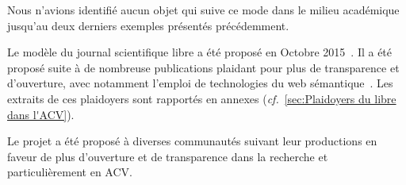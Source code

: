 Nous n'avions identifié aucun objet qui suive ce mode dans le milieu académique jusqu'au deux derniers exemples présentés précédemment.

Le modèle du journal scientifique libre a été proposé en Octobre 2015~\cite{patard_proposal_2015}.
Il a été proposé suite à de nombreuse publications plaidant pour plus de transparence et d'ouverture, avec notamment l'emploi de technologies du web sémantique~\cite{borkum_health_2014,zhang_lca-oriented_2015,davis_making_2012,mutel_ideas_2014,masanet_reflections_2014,lamela_footprinted._2011,sayan_contribution_2011,belleau_bio2rdf:_2008,perez_role_2014,ingwersen_new_2015,weidema_bonsai_2014,ciroth_ict_2007,funtowicz_science_1993,logan_ten_2010,bonanni_open_2010,madlberger_development_2013}.
Les extraits de ces plaidoyers sont rapportés en annexes (\textit{cf.}~\ref{sec:Plaidoyers du libre dans l'ACV}).  

Le projet a été proposé à diverses communautés suivant leur productions en faveur de plus d'ouverture et de transparence dans la recherche et particulièrement en ACV.

